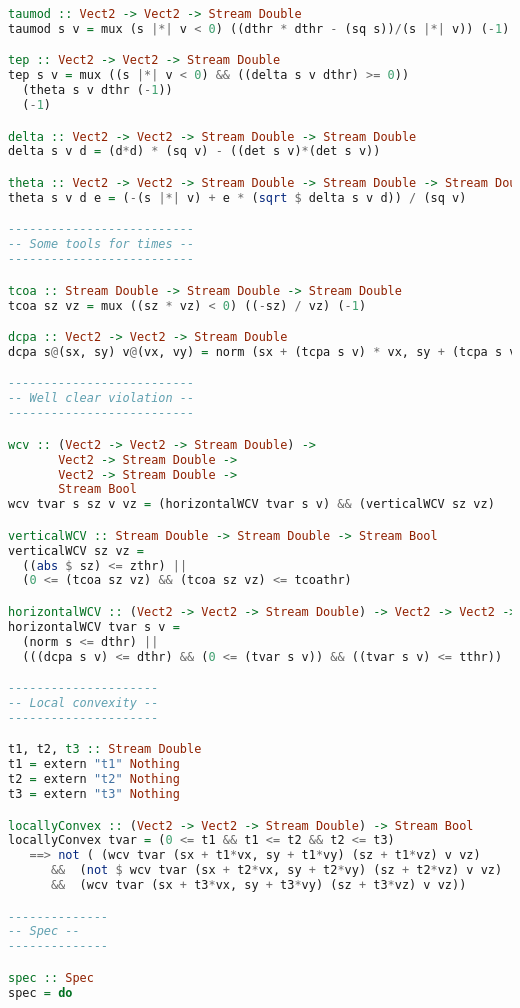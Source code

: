 \begin{lstlisting}[language=Haskell]
taumod :: Vect2 -> Vect2 -> Stream Double
taumod s v = mux (s |*| v < 0) ((dthr * dthr - (sq s))/(s |*| v)) (-1)

tep :: Vect2 -> Vect2 -> Stream Double
tep s v = mux ((s |*| v < 0) && ((delta s v dthr) >= 0))
  (theta s v dthr (-1))
  (-1)

delta :: Vect2 -> Vect2 -> Stream Double -> Stream Double
delta s v d = (d*d) * (sq v) - ((det s v)*(det s v))

theta :: Vect2 -> Vect2 -> Stream Double -> Stream Double -> Stream Double
theta s v d e = (-(s |*| v) + e * (sqrt $ delta s v d)) / (sq v)

--------------------------
-- Some tools for times --
--------------------------

tcoa :: Stream Double -> Stream Double -> Stream Double
tcoa sz vz = mux ((sz * vz) < 0) ((-sz) / vz) (-1)

dcpa :: Vect2 -> Vect2 -> Stream Double
dcpa s@(sx, sy) v@(vx, vy) = norm (sx + (tcpa s v) * vx, sy + (tcpa s v) * vy)

--------------------------
-- Well clear violation --
--------------------------

wcv :: (Vect2 -> Vect2 -> Stream Double) ->
       Vect2 -> Stream Double ->
       Vect2 -> Stream Double ->
       Stream Bool
wcv tvar s sz v vz = (horizontalWCV tvar s v) && (verticalWCV sz vz)

verticalWCV :: Stream Double -> Stream Double -> Stream Bool
verticalWCV sz vz =
  ((abs $ sz) <= zthr) ||
  (0 <= (tcoa sz vz) && (tcoa sz vz) <= tcoathr)

horizontalWCV :: (Vect2 -> Vect2 -> Stream Double) -> Vect2 -> Vect2 -> Stream Bool
horizontalWCV tvar s v =
  (norm s <= dthr) ||
  (((dcpa s v) <= dthr) && (0 <= (tvar s v)) && ((tvar s v) <= tthr))

---------------------
-- Local convexity --
---------------------

t1, t2, t3 :: Stream Double
t1 = extern "t1" Nothing
t2 = extern "t2" Nothing
t3 = extern "t3" Nothing

locallyConvex :: (Vect2 -> Vect2 -> Stream Double) -> Stream Bool
locallyConvex tvar = (0 <= t1 && t1 <= t2 && t2 <= t3)
   ==> not ( (wcv tvar (sx + t1*vx, sy + t1*vy) (sz + t1*vz) v vz)
      &&  (not $ wcv tvar (sx + t2*vx, sy + t2*vy) (sz + t2*vz) v vz)
      &&  (wcv tvar (sx + t3*vx, sy + t3*vy) (sz + t3*vz) v vz))

--------------
-- Spec --
--------------

spec :: Spec
spec = do


\end{lstlisting}
